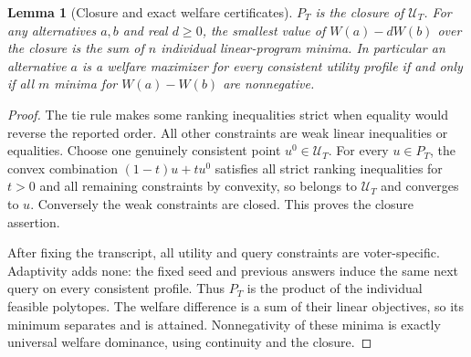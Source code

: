 \documentclass[11pt]{article}
\newtheorem{lemma}[theorem]{Lemma}
\theoremstyle{remark}
\begin{document}
\begin{lemma}[Closure and exact welfare certificates]\label{closure}
$P_T$ is the closure of $\mathcal U_T$. For any alternatives $a,b$ and
real $d\geq0$, the smallest value of $W(a)-dW(b)$ over the closure is
the sum of $n$ individual linear-program minima. In particular an
alternative $a$ is a welfare maximizer for every consistent utility
profile if and only if all $m$ minima for $W(a)-W(b)$ are nonnegative.
\end{lemma}
\begin{proof}
The tie rule makes some ranking inequalities strict when equality
would reverse the reported order. All other constraints are weak linear
inequalities or equalities. Choose one genuinely consistent point
$u^0\in\mathcal U_T$. For every $u\in P_T$, the convex combination
$(1-t)u+t u^0$ satisfies all strict ranking inequalities for $t>0$ and
all remaining constraints by convexity, so belongs to $\mathcal U_T$
and converges to $u$. Conversely the weak constraints are closed.
This proves the closure assertion.

After fixing the transcript, all utility and query constraints are
voter-specific. Adaptivity adds none: the fixed seed and previous
answers induce the same next query on every consistent profile.
Thus $P_T$ is the product of the individual feasible polytopes.
The welfare difference is a sum of their linear objectives, so its
minimum separates and is attained. Nonnegativity of these minima is
exactly universal welfare dominance, using continuity and the closure.
\end{proof}
\end{document}
